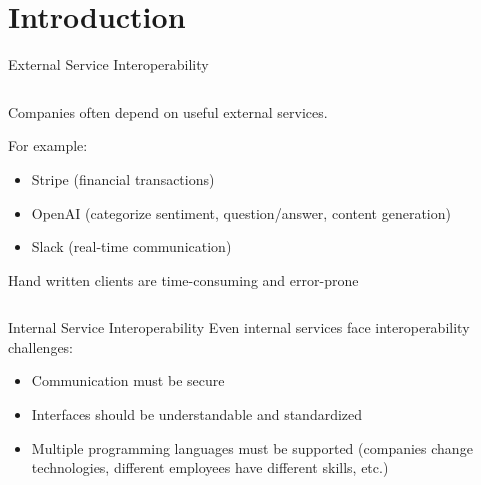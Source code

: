 \documentclass[bigger]{beamer}
\begin{document}
\section{Introduction}
\label{sec:orgb49fa3e}

\begin{frame}[label={sec:org701e58c}]{External Service Interoperability}
\begin{columns}
\begin{column}{0.6\columnwidth}
Companies often depend on useful external services.

For example:
\begin{itemize}
\item Stripe (financial transactions)
\item OpenAI (categorize sentiment, question/answer, content generation)
\item Slack (real-time communication)
\end{itemize}

Hand written clients are \alert{time-consuming} and \alert{error-prone}
\end{column}

\begin{column}{0.4\columnwidth}
\begin{center}

\end{center}

\begin{center}

\end{center}

\begin{center}

\end{center}
\end{column}
\end{columns}
\end{frame}

\begin{frame}[label={sec:org075ece3}]{Internal Service Interoperability}
Even internal services face interoperability challenges:
\begin{itemize}
\item Communication must be secure
\item Interfaces should be understandable and standardized
\item Multiple programming languages must be supported
(companies change technologies, different employees have different skills, etc.)
\end{itemize}

\begin{center}

\end{center}
\end{frame}
\end{document}
